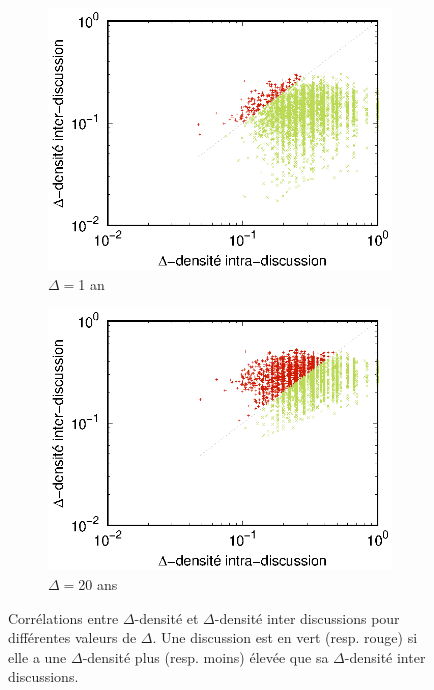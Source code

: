 \begin{figure}[h]
	\begin{subfigure}{0.4\textwidth}
		\includegraphics[width=\linewidth]{img/mailing/DensityCurve/63072000/mean.eps}
		\caption{$\Delta= $1 an}		
	\end{subfigure}
	\begin{subfigure}{0.4\textwidth}
		\includegraphics[width=\linewidth]{img/mailing/DensityCurve/1261440000/mean.eps}
		\caption{$\Delta= $20 ans}	
		\label{fig:corel_inter_discussion_20}	
	\end{subfigure}

\caption{Corrélations entre $\Delta$-densité et $\Delta$-densité inter discussions pour différentes valeurs de $\Delta$. Une discussion est en vert (resp. rouge) si elle a une $\Delta$-densité plus (resp. moins) élevée que sa $\Delta$-densité inter discussions.}
\label{fig:corel_inter_discussion}
\end{figure}




